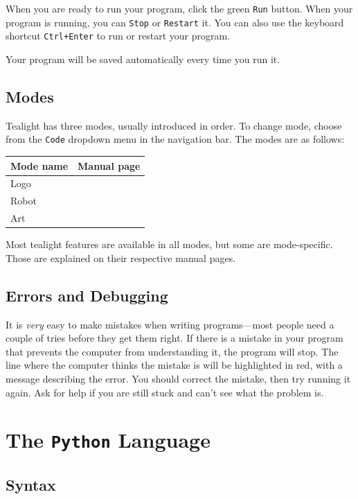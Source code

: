 \documentclass[12pt,a4paper,twoside]{article}
\renewcommand{\_}{\texttt{\symbol{95}}}
\begin{document}
When you are ready to run your program, click the green \verb^Run^ button. When your program is running, you can \verb^Stop^ or \verb^Restart^ it. You can also use the keyboard shortcut \verb^Ctrl+Enter^ to run or restart your program.

Your program will be saved automatically every time you run it.

\subsection{Modes}

Tealight has three modes, usually introduced in order. To change mode, choose from the \verb^Code^ dropdown menu in the navigation bar. The modes are as follows:


\begin{tabular}{|l|l|}
\hline
Mode name & Manual page \\
\hline
Logo & \pageref{sec:logo-mode}\\
Robot & \pageref{sec:robot-mode}\\
Art & \pageref{sec:art-mode}\\ 
\hline
\end{tabular}

Most tealight features are available in all modes, but some are
mode-specific. Those are explained on their respective manual pages.

\subsection{Errors and Debugging}

It is \emph{very} easy to make mistakes when writing programs---most
people need a couple of tries before they get them right.
If there is a mistake in your program that prevents the computer
from understanding it, the program will stop. The line where the computer thinks
the mistake is will be highlighted in red, with a message describing the error. 
You should correct the mistake, then try running it again. Ask for help if you are still
stuck and can't see what the problem is.

\newpage
\section{The \textbf{\texttt{Python}} Language}

\subsection{Syntax}
\end{document}
